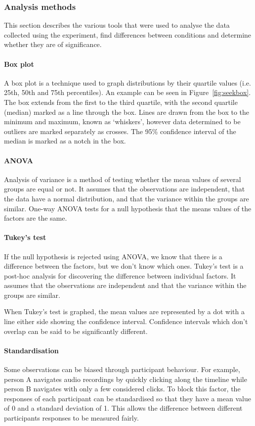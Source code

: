 \subsubsection{Analysis methods}
This section describes the various tools that were used to analyse the data
collected using the experiment, find differences between conditions and
determine whether they are of significance.

\paragraph{Box plot}
A box plot \cite{McGill1978} is a technique used to graph distributions by 
their quartile values (i.e. 25th, 50th and 75th percentiles). An example can be
seen in Figure~\ref{fig:seekbox}. The box extends from the first to the third
quartile, with the second quartile (median) marked as a line through the box.
Lines are drawn from the box to the minimum and maximum, known as `whiskers',
however data determined to be outliers are marked separately as crosses.
The 95\% confidence interval of the median is marked as a notch in the box.

\paragraph{ANOVA}
Analysis of variance is a method of testing whether the mean values of several
groups are equal or not. It assumes that the observations are independent, that
the data have a normal distribution, and that the variance within the groups
are similar. One-way ANOVA tests for a null hypothesis that the means values of
the factors are the same.

\paragraph{Tukey's test}
If the null hypothesis is rejected using ANOVA, we know that there is a
difference between the factors, but we don't know which ones. Tukey's test is a
post-hoc analysis for discovering the difference between individual factors.
It assumes that the observations are independent and that the variance within
the groups are similar.

When Tukey's test is graphed, the mean values are represented by a dot with a
line either side showing the confidence interval. Confidence intervals which
don't overlap can be said to be significantly different.

\paragraph{Standardisation}
Some observations can be biased through participant behaviour. For example,
person A navigates audio recordings by quickly clicking along the timeline
while person B navigates with only a few considered clicks. To block this
factor, the responses of each participant can be standardised so that they have
a mean value of 0 and a standard deviation of 1. This allows the difference
between different participants responses to be measured fairly.

